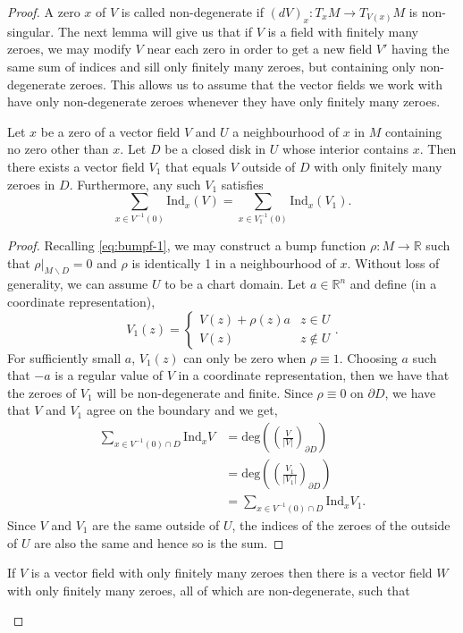 \documentclass[12pt,a4paper]{article}
\begin{document}
\begin{proof}
A zero $x$ of $V$ is called non-degenerate if $(dV)_x:T_xM\to T_{V(x)}M$ is non-singular. The next lemma will give us that if $V$ is a field with finitely many zeroes, we may modify $V$ near each zero in order to get a new field $V'$ having the same sum of indices and sill only finitely many zeroes, but containing only non-degenerate zeroes. This allows us to assume that the vector fields we work with have only non-degenerate zeroes whenever they have only finitely many zeroes.  
\begin{lemma}
Let $x$ be a zero of a vector field $V$ and $U$ a neighbourhood of $x$ in $M$ containing no zero other than $x$. Let $D$ be a closed disk in $U$ whose interior contains $x$. Then there exists a vector field $V_1$ that equals $V$ outside of $D$ with only finitely many zeroes in $D$. Furthermore, any such $V_1$ satisfies
\[
\sum_{x\in V^{-1}(0)}\mathrm{Ind}_x(V)=\sum_{x\in V_1^{-1}(0)}\mathrm{Ind}_x(V_1).
\] 
\end{lemma}
\begin{proof}
Recalling \eqref{eq:bumpf-1}, we may construct a bump function $\rho:M\to\mathbb{R}$ such that $\rho\rvert_{M\backslash D}=0$ and $\rho$ is identically 1 in a neighbourhood of $x$. Without loss of generality, we can assume $U$ to be a chart domain. Let $a\in\mathbb{R}^n$ and define (in a coordinate representation),
\[
V_1(z)=\begin{cases}
V(z)+\rho(z)a & z\in U\\
V(z) & z\notin U
\end{cases}.
\] 
For sufficiently small $a$, $V_1(z)$ can only be zero when $\rho\equiv 1$. Choosing $a$ such that $-a$ is a regular value of $V$ in a coordinate representation, then we have that the zeroes of $V_1$ will be non-degenerate and finite. Since $\rho\equiv 0$ on $\partial D$, we have that $V$ and $V_1$ agree on the boundary and we get,
\begin{align*}
\sum_{x\in V^{-1}(0)\cap D}\mathrm{Ind}_xV&=\mathrm{deg}\left(\left(\frac{V}{|V|}\right)_{\partial D} \right)\\
&=\mathrm{deg}\left(\left(\frac{V_1}{|V_1|}\right)_{\partial D}\right)\\
&=\sum_{x\in V^{-1}(0)\cap D}\mathrm{Ind}_xV_1.
\end{align*}
Since $V$ and $V_1$ are the same outside of $U$, the indices of the zeroes of the outside of $U$ are also the same and hence so is the sum.
\end{proof}
\begin{corollary}
If $V$ is a vector field with only finitely many zeroes then there is a vector field $W$ with only finitely many zeroes, all of which are non-degenerate, such that

\end{corollary}
\end{proof}
\end{document}
